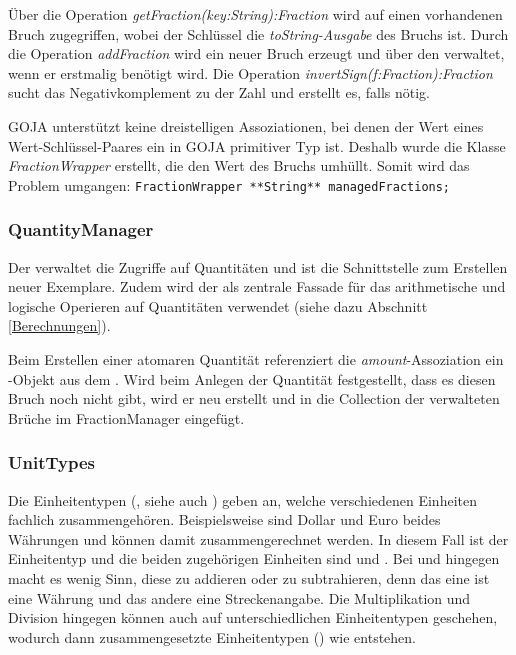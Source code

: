 Über die Operation \textit{getFraction(key:String):Fraction} wird auf einen vorhandenen Bruch zugegriffen, wobei der Schlüssel die \textit{toString-Ausgabe} des Bruchs ist.
Durch die Operation \textit{addFraction} wird ein neuer Bruch erzeugt und über den  verwaltet, wenn er erstmalig benötigt wird. Die Operation \textit{invertSign(f:Fraction):Fraction} sucht das Negativkomplement zu der Zahl und erstellt es, falls nötig.

GOJA unterstützt keine dreistelligen Assoziationen, bei denen der Wert eines Wert-Schlüssel-Paares ein in GOJA primitiver Typ ist. Deshalb wurde die Klasse \textit{FractionWrapper} erstellt, die den Wert des Bruchs umhüllt. Somit wird das Problem umgangen: \texttt{FractionWrapper **String** managedFractions;}


\subsubsection{QuantityManager}\label{QuantityManager}

Der  verwaltet die Zugriffe auf Quantitäten und ist die Schnittstelle zum Erstellen neuer Exemplare.
Zudem wird der  als zentrale Fassade für das arithmetische und logische Operieren auf Quantitäten verwendet (siehe dazu Abschnitt \ref{Berechnungen}).

Beim Erstellen einer atomaren Quantität referenziert die \textit{amount}-Assoziation ein -Objekt aus dem . 
Wird beim Anlegen der Quantität festgestellt, dass es diesen Bruch noch nicht gibt,
wird er neu erstellt und in die Collection der verwalteten Brüche im FractionManager eingefügt.

\subsubsection{UnitTypes}
Die Einheitentypen (, siehe auch ) geben an, welche verschiedenen Einheiten fachlich zusammengehören. Beispielsweise sind Dollar und Euro beides Währungen und können damit zusammengerechnet werden. 
In diesem Fall ist der Einheitentyp  und die beiden zugehörigen Einheiten sind  und . Bei  und  hingegen macht es wenig Sinn, diese zu addieren oder zu subtrahieren, 
denn das eine ist eine Währung und das andere eine Streckenangabe. Die Multiplikation und Division hingegen können auch auf unterschiedlichen Einheitentypen geschehen, 
wodurch dann zusammengesetzte Einheitentypen () wie  entstehen.

